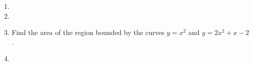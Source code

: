 \begin{enumerate}[ref={\fcProblemRef}]
\item 

\item 

\item \label{problemAreaBetweeny=x^2} Find the area of the region bounded by the curves $y=x^2$ and $y=2x^2+x-2$.



\item 
\end{enumerate}
